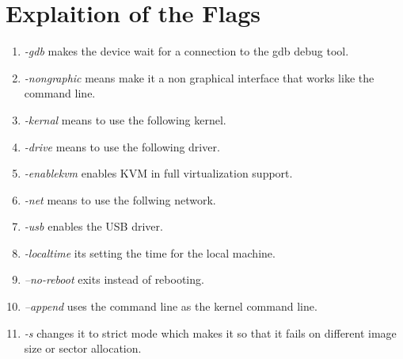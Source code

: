 \section{Explaition of the Flags}
\begin{enumerate}
   \item \textit{-gdb} makes the device wait for a connection to the gdb debug tool.
   \item \textit{-nongraphic} means make it a non graphical interface that works like the command line.
   \item \textit{ -kernal} means to use the following kernel.
   \item \textit{-drive} means to use the following driver.
   \item \textit{-enablekvm} enables KVM in full virtualization support.
   \item \textit{-net} means to use the follwing network.
   \item \textit{-usb} enables the USB driver.
   \item \textit{-localtime} its setting the time for the local machine.
   \item \textit{--no-reboot} exits instead of rebooting. 
   \item \textit{--append} uses the command line as the kernel command line.
   \item \textit{-s} changes it to strict mode which makes it so that it fails on different image size or sector allocation.
\end{enumerate}

